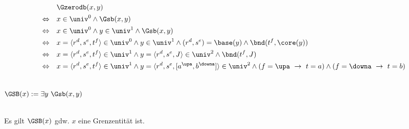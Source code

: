 \begin{hyp}
    \begin{align*}
        &\Gzerodb(x,y)\\
        \Leftrightarrow \quad &x \in \univ^0 \land \Gsb(x,y)\\
        \Leftrightarrow \quad &x \in \univ^0 \land y \in \univ^1 \land \Gsb(x,y)\\
        \Leftrightarrow \quad &x = \langle r^d, s^e, t^f \rangle \in \univ^0 \land y \in \univ^1 \land (r^d,s^e) = \base(y) \land \bnd(t^f, \core(y))\\
        \Leftrightarrow \quad &x = \langle r^d, s^e, t^f \rangle \in \univ^1 \land y = \langle r^d, s^e, J \rangle \in \univ^2 \land \bnd(t^f,J)\\
        \Leftrightarrow \quad &x = \langle r^d, s^e, t^f \rangle \in \univ^1 \land y = \langle r^d, s^e, [a^\upa,b^\downa] \rangle \in \univ^2 \land (f = \upa \ \to\ t = a) \land (f = \downa \ \to\ t = b)
    \end{align*}
\end{hyp}


\begin{erin}\ \\
    $\GSB(x) := \exists y\ \Gsb(x,y)$
\end{erin}

\begin{satz}\ \\
    Es gilt $\GSB(x)$ gdw. $x$ eine Grenzentität ist.
\end{satz}

